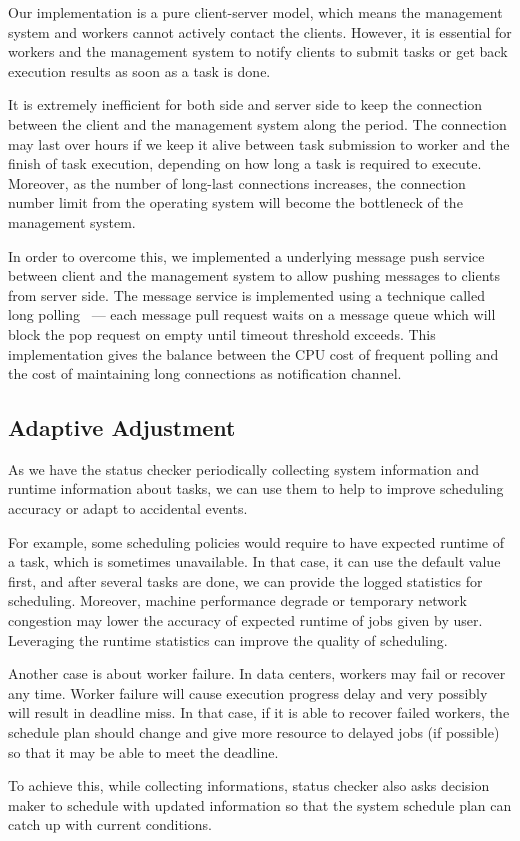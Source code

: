 Our implementation is a pure client-server model, which means the
management system and workers cannot actively contact the clients.
However, it is essential for workers and the management system to notify
clients to submit tasks or get back execution results as soon as a task
is done.

It is extremely inefficient for both side and server side to keep the
connection between the client and the management system along the
period.
The connection may last over hours if we keep it alive between task
submission to worker and the finish of task execution, depending on how
long a task is required to execute.
Moreover, as the number of long-last connections increases, the
connection number limit from the operating system will become the
bottleneck of the management system.

In order to overcome this, we implemented a underlying message push
service between client and the management system to allow pushing
messages to clients from server side.
The message service is implemented using a technique called long
polling~\cite{cite:push-pull} --- each message pull request waits on a
message queue which will block the pop request on empty until timeout
threshold exceeds.
This implementation gives the balance between the CPU cost of frequent
polling and the cost of maintaining long connections as notification
channel.

\subsection{Adaptive Adjustment}

As we have the status checker periodically collecting system information
and runtime information about tasks, we can use them to help to improve
scheduling accuracy or adapt to accidental events.

For example, some scheduling policies would require to have expected
runtime of a task, which is sometimes unavailable.
In that case, it can use the default value first, and after several
tasks are done, we can provide the logged statistics for scheduling.
Moreover, machine performance degrade or temporary network congestion
may lower the accuracy of expected runtime of jobs given by user.
Leveraging the runtime statistics can improve the quality of
scheduling.

Another case is about worker failure.
In data centers, workers may fail or recover any time.
Worker failure will cause execution progress delay and very possibly
will result in deadline miss.
In that case, if it is able to recover failed workers, the schedule plan
should change and give more resource to delayed jobs (if possible) so
that it may be able to meet the deadline.

To achieve this, while collecting informations, status checker also
asks decision maker to schedule with updated information so that the
system schedule plan can catch up with current conditions.
